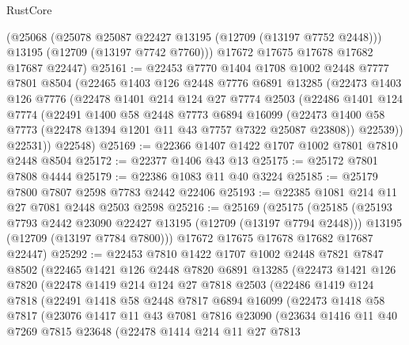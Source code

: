 \begin{lexlean}{RustCore}
\begin{coremodule}
      (@25068
        (@25078 @25087 @22427 @13195 (@12709 (@13197 @7752 @2448)))
        @13195
        (@12709 (@13197 @7742 @7760)))
      @17672
      @17675
      @17678
      @17682
      @17687
      @22447)
@25161 := @22453
    @7770
    @1404
    @1708
    @1002
    @2448
    @7777
    @7801
    @8504
    (@22465
      @1403
      @126
      @2448
      @7776
      @6891
      @13285
      (@22473
        @1403
        @126
        @7776
        (@22478
          @1401
          @214
          @124
          @27
          @7774
          @2503
          (@22486
            @1401
            @124
            @7774
            (@22491
              @1400
              @58
              @2448
              @7773
              @6894
              @16099
              (@22473 @1400 @58 @7773 (@22478 @1394 @1201 @11 @43 @7757 @7322 @25087 @23808))
              @22539))
          @22531))
      @22548)
@25169 := @22366 @1407 @1422 @1707 @1002 @7801 @7810 @2448 @8504
@25172 := @22377 @1406 @43 @13
@25175 := @25172 @7801 @7808 @4444
@25179 := @22386 @1083 @11 @40 @3224
@25185 := @25179 @7800 @7807 @2598 @7783 @2442 @22406
@25193 := @22385 @1081 @214 @11 @27 @7081 @2448 @2503 @2598
@25216 := @25169
    (@25175
      (@25185
        (@25193 @7793 @2442 @23090 @22427 @13195 (@12709 (@13197 @7794 @2448)))
        @13195
        (@12709 (@13197 @7784 @7800)))
      @17672
      @17675
      @17678
      @17682
      @17687
      @22447)
@25292 := @22453
    @7810
    @1422
    @1707
    @1002
    @2448
    @7821
    @7847
    @8502
    (@22465
      @1421
      @126
      @2448
      @7820
      @6891
      @13285
      (@22473
        @1421
        @126
        @7820
        (@22478
          @1419
          @214
          @124
          @27
          @7818
          @2503
          (@22486
            @1419
            @124
            @7818
            (@22491
              @1418
              @58
              @2448
              @7817
              @6894
              @16099
              (@22473
                @1418
                @58
                @7817
                (@23076
                  @1417
                  @11
                  @43
                  @7081
                  @7816
                  @23090
                  (@23634
                    @1416
                    @11
                    @40
                    @7269
                    @7815
                    @23648
                    (@22478
                      @1414
                      @214
                      @11
                      @27
                      @7813

\end{coremodule}
\end{lexlean}
